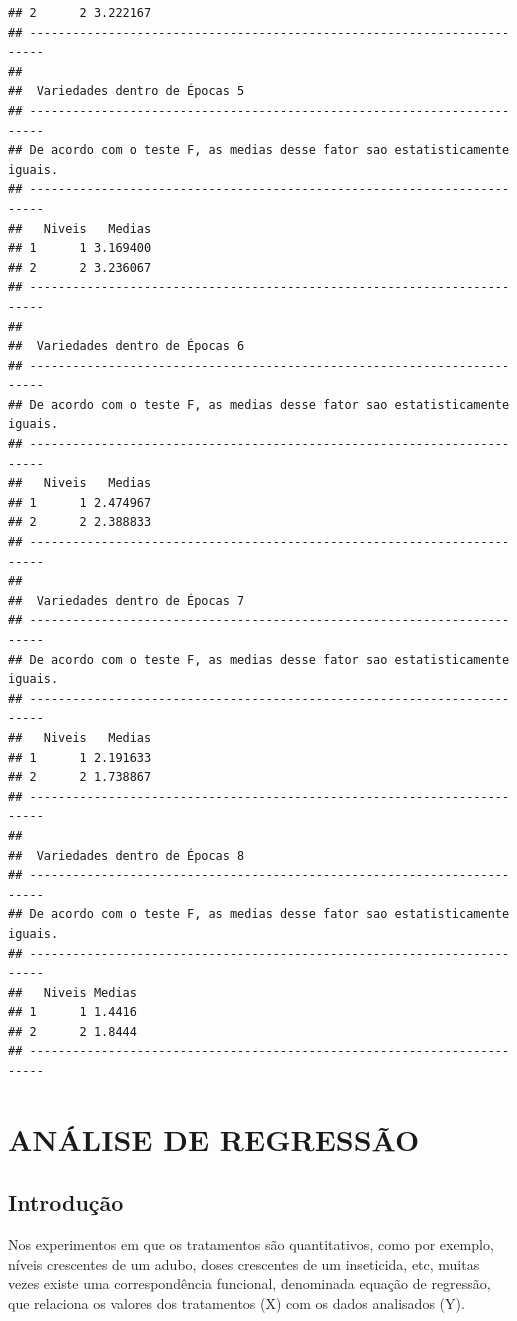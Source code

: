 \documentclass[
]{book}
\begin{document}
\begin{verbatim}
## 2      2 3.222167
## ------------------------------------------------------------------------
## 
##  Variedades dentro de Épocas 5
## ------------------------------------------------------------------------
## De acordo com o teste F, as medias desse fator sao estatisticamente iguais.
## ------------------------------------------------------------------------
##   Niveis   Medias
## 1      1 3.169400
## 2      2 3.236067
## ------------------------------------------------------------------------
## 
##  Variedades dentro de Épocas 6
## ------------------------------------------------------------------------
## De acordo com o teste F, as medias desse fator sao estatisticamente iguais.
## ------------------------------------------------------------------------
##   Niveis   Medias
## 1      1 2.474967
## 2      2 2.388833
## ------------------------------------------------------------------------
## 
##  Variedades dentro de Épocas 7
## ------------------------------------------------------------------------
## De acordo com o teste F, as medias desse fator sao estatisticamente iguais.
## ------------------------------------------------------------------------
##   Niveis   Medias
## 1      1 2.191633
## 2      2 1.738867
## ------------------------------------------------------------------------
## 
##  Variedades dentro de Épocas 8
## ------------------------------------------------------------------------
## De acordo com o teste F, as medias desse fator sao estatisticamente iguais.
## ------------------------------------------------------------------------
##   Niveis Medias
## 1      1 1.4416
## 2      2 1.8444
## ------------------------------------------------------------------------
\end{verbatim}

\hypertarget{anuxe1lise-de-regressuxe3o}{%
\chapter{ANÁLISE DE REGRESSÃO}\label{anuxe1lise-de-regressuxe3o}}

\hypertarget{introduuxe7uxe3o-3}{%
\section{Introdução}\label{introduuxe7uxe3o-3}}

Nos experimentos em que os tratamentos são quantitativos, como por exemplo, níveis crescentes de um adubo, doses crescentes de um inseticida, etc, muitas vezes existe uma correspondência funcional, denominada equação de regressão, que relaciona os valores dos tratamentos (X) com os dados analisados (Y).
\end{document}
